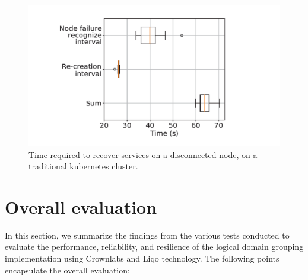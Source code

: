 \begin{figure}[ht]\centering
\includegraphics[scale=0.5]{Pictures/seba}
\caption{Time required to recover services on a disconnected node, on a traditional kubernetes cluster.}\label{fig:seba}
\end{figure}

\section{Overall evaluation}
In this section, we summarize the findings from the various tests conducted to evaluate the performance, reliability, and resilience of the logical domain grouping implementation using Crownlabs and Liqo technology. The following points encapsulate the overall evaluation:

